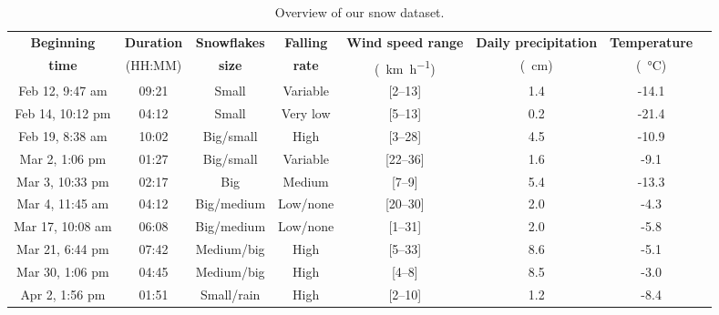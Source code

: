 \begin{table}[htbp]
    \centering
    \begin{tabular}{|c|c|c|c|c|c|c|c|}
        \hline
        \textbf{Beginning} & \textbf{Duration} & \textbf{Snowflakes} & \textbf{Falling} & \textbf{Wind speed range} & \textbf{Daily precipitation}  & \textbf{Temperature} \\
        \textbf{time}      & (HH:MM)           & \textbf{size}       & \textbf{rate}    & (\SI{}{\km\per\hour})     & (\SI{}{\cm})                  & (\SI{}{\celsius})    \\\hline
        Feb 12, 9:47 am    &  09:21            & Small               & Variable         & [2--13]                   & 1.4                           & -14.1                \\\hline
        Feb 14, 10:12 pm   &  04:12            & Small               & Very low         & [5--13]                   & 0.2                           & -21.4                \\\hline
        Feb 19, 8:38 am    &  10:02            & Big/small           & High             & [3--28]                   & 4.5                           & -10.9                \\\hline
        Mar 2, 1:06 pm     &  01:27            & Big/small           & Variable         & [22--36]                  & 1.6                           & -9.1                 \\\hline
        Mar 3, 10:33 pm    &  02:17            & Big                 & Medium           & [7--9]                    & 5.4                           & -13.3                \\\hline
        Mar 4, 11:45 am    &  04:12            & Big/medium          & Low/none         & [20--30]                  & 2.0                           & -4.3                 \\\hline
        Mar 17, 10:08 am   &  06:08            & Big/medium          & Low/none         & [1--31]                   & 2.0                           & -5.8                 \\\hline
        Mar 21, 6:44 pm    &  07:42            & Medium/big          & High             & [5--33]                   & 8.6                           & -5.1                 \\\hline
        Mar 30, 1:06 pm    &  04:45            & Medium/big          & High             & [4--8]                    & 8.5                           & -3.0                 \\\hline
        Apr 2, 1:56 pm     &  01:51            & Small/rain          & High             & [2--10]                   & 1.2                           & -8.4                 \\\hline
    \end{tabular}
    \caption{Overview of our snow dataset.}
    \label{tab:overview-dataset}
\end{table}

